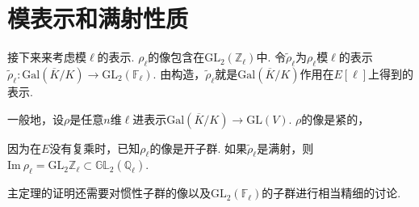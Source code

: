 \section{模表示和满射性质}

接下来来考虑模$\ell$的表示. $\rho_{\ell}$的像包含在$\mathrm{GL}_2(\mathbb{Z}_{\ell})$中.
令$\tilde{\rho}_{\ell}$为$\rho_{\ell}$模$\ell$的表示
$\tilde{\rho}_{\ell}: \mathrm{Gal}(\overline{K}/K)\to \mathrm{GL}_2(\mathbb{F}_{\ell})$.
由构造，$\tilde{\rho}_{\ell}$就是$\mathrm{Gal}(\overline{K}/K)$作用在$E[\ell]$上得到的表示.

一般地，设$\rho$是任意$n$维$\ell$进表示$\mathrm{Gal}(\overline{K}/K)\to \mathrm{GL}(V)$.
$\rho$的像是紧的，

因为在$E$没有复乘时，已知$\rho_{\ell}$的像是开子群. 如果$\tilde{\rho}_{\ell}$是满射，则$\mathrm{Im}\ \rho_{\ell} = \mathrm{GL}_2{\mathbb{Z}_{\ell}} \subset \mathbb{GL}_2(\mathbb{Q}_{\ell})$.

主定理的证明还需要对惯性子群的像以及$\mathrm{GL}_2(\mathbb{F}_{\ell})$的子群进行相当精细的讨论.







%

